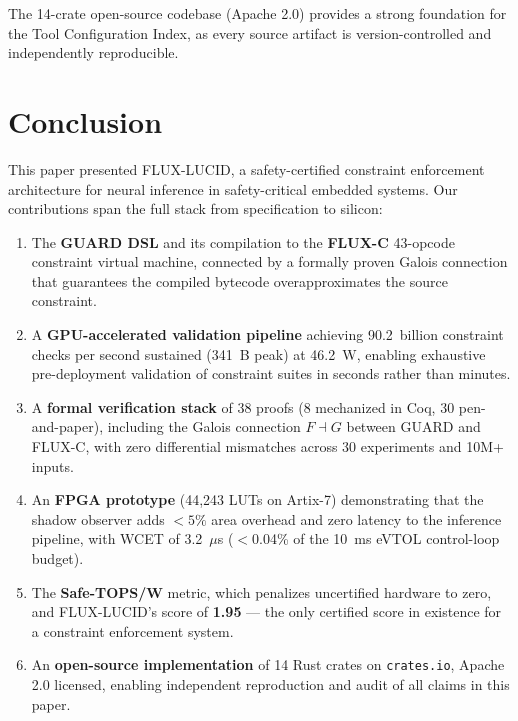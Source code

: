 \documentclass[sigplan,review,anonymous]{acmart}
\begin{document}
{The 14-crate open-source codebase (Apache 2.0) provides a strong
foundation for the Tool Configuration Index, as every source artifact
is version-controlled and independently reproducible.


\section{Conclusion}
\label{sec:conclusion}

This paper presented FLUX-LUCID, a safety-certified constraint
enforcement architecture for neural inference in safety-critical
embedded systems. Our contributions span the full stack from
specification to silicon:

\begin{enumerate}
  \item The \textbf{GUARD DSL} and its compilation to the
        \textbf{FLUX-C} 43-opcode constraint virtual machine, connected
        by a formally proven Galois connection that guarantees
        the compiled bytecode overapproximates the source constraint.
  \item A \textbf{GPU-accelerated validation pipeline} achieving
        90.2~billion constraint checks per second sustained (341~B peak)
        at 46.2~W, enabling exhaustive pre-deployment validation of
        constraint suites in seconds rather than minutes.
  \item A \textbf{formal verification stack} of 38 proofs (8 mechanized
        in Coq, 30 pen-and-paper), including the Galois connection
        $F \dashv G$ between GUARD and FLUX-C, with zero differential
        mismatches across 30 experiments and 10M+ inputs.
  \item An \textbf{FPGA prototype} (44,243 LUTs on Artix-7) demonstrating
        that the shadow observer adds $< 5\%$ area overhead and zero
        latency to the inference pipeline, with WCET of 3.2~$\mu$s
        ($<$0.04\% of the 10~ms eVTOL control-loop budget).
  \item The \textbf{Safe-TOPS/W} metric, which penalizes uncertified
        hardware to zero, and FLUX-LUCID's score of \textbf{1.95}
        — the only certified score in existence for a constraint
        enforcement system.
  \item An \textbf{open-source implementation} of 14 Rust crates on
        \texttt{crates.io}, Apache 2.0 licensed, enabling independent
        reproduction and audit of all claims in this paper.
\end{enumerate}

}
\end{document}
